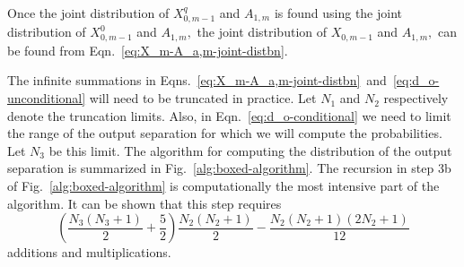 \documentclass[11pt]{article}
\begin{document}
Once the joint distribution of $X^q_{0,m-1}$ and $A_{1,m}$ is found
using the joint distribution of $X^0_{0,m-1}$ and $A_{1,m},$ the joint
distribution of $X_{0,m-1}$ and $A_{1,m},$ can be found from
Eqn.~\ref{eq:X_m-A_a,m-joint-distbn}.

The infinite summations in
Eqns.~\ref{eq:X_m-A_a,m-joint-distbn}~and~\ref{eq:d_o-unconditional}
will need to be truncated in practice. Let $N_1$ and $N_2$
respectively denote the truncation limits. Also, in
Eqn.~\ref{eq:d_o-conditional} we need to limit the range of the output
separation for which we will compute the probabilities. Let $N_3$ be
this limit. The algorithm for computing the distribution of the output
separation is summarized in Fig.~\ref{alg:boxed-algorithm}.  The
recursion in step 3b of Fig.~\ref{alg:boxed-algorithm} is
computationally the most intensive part of the algorithm. It can be
shown that this step requires
\begin{displaymath}
  \left(\frac{N_3(N_3+1)}{2} + \frac{5}{2} \right) \frac{N_2(N_2+1)}{2}
  - \frac{N_2(N_2+1)(2N_2 +1)}{12} 
\end{displaymath}
additions and multiplications. 
\end{document}
